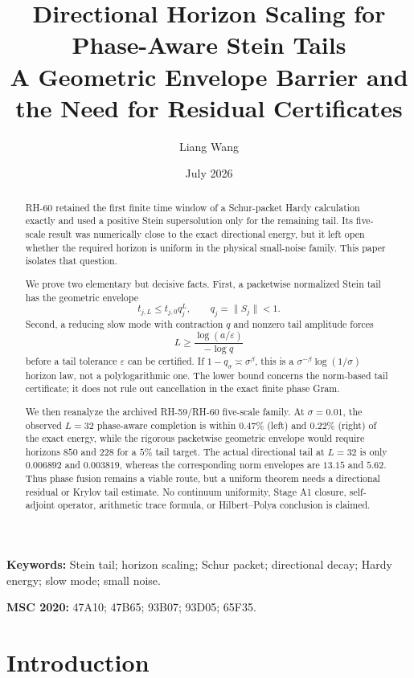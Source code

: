 \documentclass[11pt]{article}
\title{Directional Horizon Scaling for Phase-Aware Stein Tails\\
\large A Geometric Envelope Barrier and the Need for Residual Certificates}
\author{Liang Wang}
\date{July 2026}
\theoremstyle{remark}
\begin{document}
\maketitle

\begin{abstract}
RH-60 retained the first finite time window of a Schur-packet Hardy
calculation exactly and used a positive Stein supersolution only for the
remaining tail.  Its five-scale result was numerically close to the exact
directional energy, but it left open whether the required horizon is uniform
in the physical small-noise family.  This paper isolates that question.

We prove two elementary but decisive facts.  First, a packetwise normalized
Stein tail has the geometric envelope
\[
 t_{j,L}\le t_{j,0}q_j^L,
 \qquad q_j=\|S_j\|<1.
\]
Second, a reducing slow mode with contraction $q$ and nonzero tail amplitude
forces
\[
 L\ge \frac{\log(a/\varepsilon)}{-\log q}
\]
before a tail tolerance $\varepsilon$ can be certified.  If
$1-q_\sigma\asymp\sigma^\beta$, this is a
$\sigma^{-\beta}\log(1/\sigma)$ horizon law, not a polylogarithmic one.
The lower bound concerns the norm-based tail certificate; it does not rule
out cancellation in the exact finite phase Gram.

We then reanalyze the archived RH-59/RH-60 five-scale family.  At
$\sigma=0.01$, the observed $L=32$ phase-aware completion is within
$0.47\%$ (left) and $0.22\%$ (right) of the exact energy, while the rigorous
packetwise geometric envelope would require horizons $850$ and $228$ for a
$5\%$ tail target.  The actual directional tail at $L=32$ is only
$0.006892$ and $0.003819$, whereas the corresponding norm envelopes are
$13.15$ and $5.62$.  Thus phase fusion remains a viable route, but a uniform
theorem needs a directional residual or Krylov tail estimate.  No continuum
uniformity, Stage A1 closure, self-adjoint operator, arithmetic trace
formula, or Hilbert--Polya conclusion is claimed.
\end{abstract}

\noindent\textbf{Keywords:} Stein tail; horizon scaling; Schur packet;
directional decay; Hardy energy; slow mode; small noise.

\medskip
\noindent\textbf{MSC 2020:} 47A10; 47B65; 93B07; 93D05; 65F35.

\section{Introduction}
\end{document}
